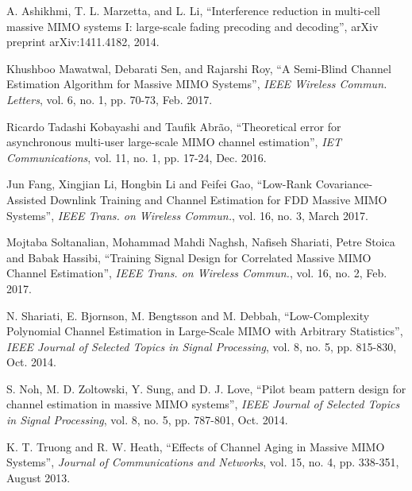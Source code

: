 \documentclass[journal,12pt,onecolumn]{IEEEtran}
\begin{document}
\begin{thebibliography}{1}
A. Ashikhmi, T. L. Marzetta, and L. Li, \textquotedblleft{Interference reduction in multi-cell massive MIMO systems I: large-scale fading precoding and decoding\textquotedblright}, arXiv preprint arXiv:1411.4182, 2014.

Khushboo Mawatwal, Debarati Sen, and Rajarshi Roy, \textquotedblleft{A Semi-Blind Channel Estimation Algorithm for Massive MIMO Systems\textquotedblright}, \emph{IEEE Wireless Commun. Letters}, vol. 6, no. 1, pp. 70-73, Feb. 2017.

Ricardo Tadashi Kobayashi  and Taufik Abrão, \textquotedblleft{Theoretical error for asynchronous multi-user large-scale MIMO channel estimation\textquotedblright}, \emph{IET Communications}, vol. 11, no. 1, pp. 17-24, Dec. 2016.

Jun Fang, Xingjian Li, Hongbin Li and Feifei Gao, \textquotedblleft{Low-Rank Covariance-Assisted Downlink Training and Channel Estimation for FDD Massive MIMO Systems\textquotedblright}, \emph{IEEE Trans. on Wireless Commun.}, vol. 16, no. 3, March 2017.

Mojtaba Soltanalian, Mohammad Mahdi Naghsh, Nafiseh Shariati, Petre Stoica and Babak Hassibi, \textquotedblleft{Training Signal Design for Correlated Massive MIMO Channel Estimation\textquotedblright}, \emph{IEEE Trans. on Wireless Commun.}, vol. 16, no. 2, Feb. 2017.

N. Shariati, E. Bjornson, M. Bengtsson and M. Debbah, \textquotedblleft{Low-Complexity Polynomial Channel Estimation in Large-Scale MIMO with Arbitrary Statistics\textquotedblright}, \emph{IEEE Journal of Selected Topics in Signal Processing}, vol. 8, no. 5, pp. 815-830, Oct. 2014.

S. Noh, M. D. Zoltowski, Y. Sung, and D. J. Love, \textquotedblleft{Pilot beam pattern design for channel estimation in massive MIMO systems\textquotedblright}, \emph{IEEE Journal of Selected Topics in Signal Processing}, vol. 8, no. 5, pp. 787-801, Oct. 2014.

K. T. Truong and R. W. Heath, \textquotedblleft{Effects of Channel Aging in Massive MIMO Systems\textquotedblright}, \emph{Journal of Communications and Networks}, vol. 15, no. 4, pp. 338-351, August 2013.


\end{thebibliography}
\end{document}
